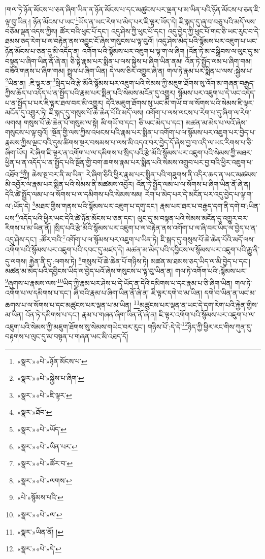 །གལ་ཏེ་ཉོན་མོངས་པ་ཅན་ཞིག་ཡིན་ན་ཉོན་མོངས་པ་དང་མཚུངས་པར་ལྡན་པ་མ་ཡིན་པའི་ཉོན་མོངས་པ་ཅན་ཇི་ལྟ་བུ་ཡིན:། ཉོན་མོངས་པ་ཡང་\footnote{«སྣར་»«པེ་»ཉོན་མོངས་པ་}ཡོད་ན་ཡང་རེག་པ་མེད་པར་ཇི་ལྟར་ཡོད་དེ། ཇི་སྐད་དུ་ཞུ་བ་བཅུ་པའི་མདོ་ལས་བཅོམ་ལྡན་འདས་ཀྱིས། ཚོར་བའི་ཕུང་པོ་དང་། འདུ་ཤེས་ཀྱི་ཕུང་པོ་དང་། འདུ་བྱེད་ཀྱི་ཕུང་པོ་གང་ཅི་ཡང་རུང་བ་དེ་ཐམས་ཅད་རེག་པ་ལ་བརྟེན་ནས་འབྱུང་ངོ་ཞེས་གསུངས་པ་ལྟ་བུའོ། །འདུ་ཤེས་མེད་པའི་སྙོམས་པར་འཇུག་པ་ཡང་ཉོན་མོངས་པ་ཅན་དུ་མི་འདོད་ན། འགོག་པའི་སྙོམས་པར་འཇུག་པ་ལྟ་ག་ལ་ཞིག །འོན་ཏེ་མ་བསྒྲིབས་ལ་ལུང་དུ་མ་བསྟན་པ་ཞིག་ཡིན་ནོ་ཞེ་ན། ཅི་སྟེ་རྣམ་པར་སྨིན་པ་ལས་སྐྱེས་པ་ཞིག་ཡིན་ནམ། འོན་ཏེ་སྤྱོད་ལམ་པ་ཞིག་གམ། བཟོའི་གནས་པ་ཞིག་གམ། སྤྲུལ་པ་ཞིག་ཡིན། དེ་ལས་ཅིར་འགྱུར་ཞེ་ན། གལ་ཏེ་རྣམ་པར་སྨིན་པ་ལས་:སྐྱེས་པ་\footnote{«སྣར་»«པེ་»སྐྱེས་པ་ཞིག་}ཡིན་ན། :ཇི་ལྟར་ན་\footnote{«སྣར་»«པེ་»ཇི་ལྟར་}སྲིད་པའི་རྩེ་མོའི་སྙོམས་པར་འཇུག་པའི་སེམས་ཀྱི་མཇུག་ཐོགས་སུ་འོག་མ་གཞན་བརྒྱད་ཀྱིས་ཆོད་པ་འདོད་པ་ན་སྤྱོད་པའི་རྣམ་པར་སྨིན་པའི་སེམས་མངོན་དུ་འགྱུར། སྙོམས་པར་འཇུག་པ་དེ་ཡང་འདོད་པ་ན་སྤྱོད་པ་པར་ཇི་ལྟར་ཐལ་བར་མི་འགྱུར། དེའི་མཇུག་ཐོགས་སུ་ཡང་མི་གཡོ་བ་ལ་སོགས་པའི་སེམས་ཇི་ལྟར་མངོན་དུ་འགྱུར་ཏེ། ཇི་སྐད་དུ་གསུས་པོ་ཆེ་ཆེན་པོའི་མདོ་ལས། འགོག་པ་ལས་ལངས་པ་རེག་པ་དུ་ཞིག་ལ་རེག་ལགས། གསུས་པོ་ཆེ་ཆེན་པོ་གསུམ་ལ་སྟེ། མི་གཡོ་བ་དང་། ཅི་ཡང་མེད་པ་དང་། མཚན་མ་མེད་པ་ལའོ་ཞེས་གསུངས་པ་ལྟ་བུའོ། །སྔོན་གྱི་ལས་ཀྱིས་འཕངས་པའི་རྣམ་པར་སྨིན་པ་འགོག་པ་ལ་སྙོམས་པར་འཇུག་པར་བྱེད་པ་རྣམས་ཀྱིས་ལྡང་བའི་དུས་ཚིགས་སྔར་བསམས་པ་ལས་མི་འདའ་བར་བྱེད་དོ་ཞེས་བྱ་བ་འདི་ལ་ཡང་རིགས་པ་ཅི་ཞིག་ཡོད། རེ་ཞིག་ཇི་ལྟར་ན་འགོག་པ་ལ་དམིགས་པ་སྲིད་པའི་རྩེ་མོའི་སྙོམས་པར་འཇུག་པའི་སེམས་ཀྱི་མཐར་ཕྱིན་པ་ན་འདོད་པ་ན་སྤྱོད་པའི་སྔོན་གྱི་བག་ཆགས་རྣམ་པར་སྨིན་པའི་སེམས་འགྲུབ་པར་བྱ་བའི་ཕྱིར་འཇུག་པ་འཐོབ་\footnote{«སྣར་»ཐོབ་}ཀྱི། ཆེས་སྔ་བར་ནི་མ་ཡིན། རེ་ཞིག་ཅིའི་ཕྱིར་རྣམ་པར་སྨིན་པའི་གཟུགས་ནི་འདིར་ཆད་ན་ཡང་མཚམས་མི་འབྱོར་ལ་རྣམ་པར་སྨིན་པའི་སེམས་ནི་མཚམས་འབྱོར། འོན་ཏེ་སྤྱོད་ལམ་པ་ལ་སོགས་པ་ཞིག་ཡིན་ནོ་ཞེ་ན། དེའི་ཚེ་སྤྱོད་ལམ་པ་ལ་སོགས་པ་ལ་དམིགས་པའི་སེམས་སམ། རེག་པ་མེད་པར་དེ་མངོན་པར་འདུ་བྱེད་པ་ལྟ་ག་ལ་:ཡོད་དེ། \footnote{«སྣར་»«པེ་»ཡོད་}མཐར་གྱིས་གནས་པའི་སྙོམས་པར་འཇུག་པ་དགུ་དང་། རྣམ་པར་ཐར་པ་བརྒྱད་དག་ནི་དགེ་བ་:ཡིན་པས་\footnote{«སྣར་»«པེ་»ཡིན་པར་}འདོད་པའི་ཕྱིར་ཡང་དེའི་ཚེ་ཉོན་མོངས་པ་ཅན་དང་། ལུང་དུ་མ་བསྟན་པའི་སེམས་མངོན་དུ་འགྱུར་བར་རིགས་པ་མ་ཡིན་ནོ། །སྲིད་པའི་རྩེ་མོའི་སྙོམས་པར་འཇུག་པ་ལ་བརྟེན་ནས་འགོག་པ་ལ་ཞི་བར་ཡིད་ལ་བྱེད་པ་ན་འདུ་ཤེས་དང་། :ཚོར་བའི་\footnote{«སྣར་»«པེ་»ཚོར་བ་}འགོག་པ་ལ་སྙོམས་པར་འཇུག་པ་ཡིན་ཏེ། ཇི་སྐད་དུ་གསུས་པོ་ཆེ་ཆེན་པོའི་མདོ་ལས་འགོག་པའི་སྙོམས་པར་འཇུག་པའི་དབང་དུ་མཛད་དེ། མཚན་མ་མེད་པའི་དབྱིངས་ལ་སྙོམས་པར་འཇུག་པའི་རྒྱུ་ནི་དུ་ལགས། རྐྱེན་ནི་དུ་:ལགས་ཏེ། \footnote{«སྣར་»«པེ་»ལགས་}གསུས་པོ་ཆེ་ཆེན་པོ་གཉིས་ཏེ། མཚན་མ་ཐམས་ཅད་ཡིད་ལ་མི་བྱེད་པ་དང་། མཚན་མ་མེད་པའི་དབྱིངས་ཡིད་ལ་བྱེད་པའོ་ཞེས་གསུངས་པ་ལྟ་བུ་ཡིན་ན། གལ་ཏེ་འགོག་པའི་:སྙོམས་པར་\footnote{«པེ་»སྙོམས་པའི་}ཞུགས་པ་རྣམས་ལས་\footnote{«སྣར་»«པེ་»ལ་}ཡིད་ཀྱི་རྣམ་པར་ཤེས་པ་དེ་ཡོད་ན་དེའི་དམིགས་པ་དང་རྣམ་པ་ཅི་ཞིག་ཡིན། གལ་ཏེ་འགོག་པ་ལ་དམིགས་པ་དང་། ཞི་བའི་རྣམ་པ་ཞིག་ཡིན་ནོ་ཞེ་ན། ཇི་ལྟར་དགེ་བ་མ་ཡིན། དགེ་བ་ཡིན་ན་ཡང་མ་ཆགས་པ་ལ་སོགས་པ་དང་མཚུངས་པར་ལྡན་པ་མ་ཡིན། \footnote{«སྣར་»ཡིན་ནོ། ། }མཚུངས་པར་ལྡན་ན་ཡང་དེ་དག་རེག་པའི་རྐྱེན་གྱིས་མ་ཡིན། འོན་ཏེ་དམིགས་པ་དང་། རྣམ་པ་གཞན་ཞིག་ཡིན་ནོ་ཞེ་ན། ཇི་ལྟར་འགོག་པའི་སྙོམས་པར་འཇུག་པ་ལ་འཇུག་པའི་སེམས་ཀྱི་མཇུག་ཐོགས་སུ་སེམས་གཡེང་བར་རུང་། གཉིས་པོ་:དེ་དེ་\footnote{«སྣར་»«པེ་»དེ་}ཉིད་ཀྱི་ཕྱིར་རང་གིས་ཀུན་དུ་བརྟགས་པ་ལུང་དུ་མ་བསྟན་པ་གཞན་ཡང་མི་འཐད་དོ། 